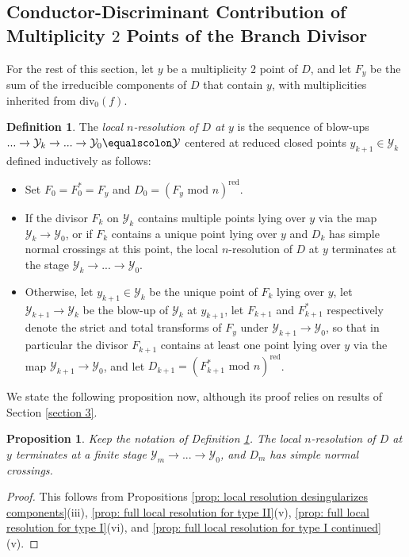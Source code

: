 \documentclass[12pt]{amsart}
\numberwithin{equation}{section}
\newtheorem{prop}[equation]{Proposition}
\theoremstyle{definition}
\newtheorem{defn}[equation]{Definition}
\newcommand{\Y}{\mathcal{Y}}
\newcommand{\tx}[1]{\text{#1}}
\begin{document}
\subsection{Conductor-Discriminant Contribution of Multiplicity $2$ Points of the Branch Divisor}\label{subsection 2.3}\hfill

For the rest of this section, let $y$ be a multiplicity $2$ point of $D$, and let $F_y$ be the sum of the irreducible components of $D$ that contain $y$, with multiplicities inherited from $\tx{div}_0(f)$.
\begin{defn}\label{dfn: resolution of local branch divisor}
    The \textit{local $n$-resolution of $D$ at $y$} is the sequence of blow-ups $...\to\Y_k\to...\to\Y_0\equalscolon \Y$ centered at reduced closed points $y_{k+1}\in\Y_k$ defined inductively as follows:
    \begin{itemize}
        \item Set $F_0=F_0^*=F_y$ and $D_0=(F_y\tx{ mod }n)^\tx{red}$.
        \item If the divisor $F_k$ on $\Y_k$ contains multiple points lying over $y$ via the map $\Y_k\to\Y_0$, or if $F_k$ contains a unique point lying over $y$ and $D_k$ has simple normal crossings at this point, the local $n$-resolution of $D$ at $y$ terminates at the stage $\Y_k\to...\to\Y_0$.
        \item Otherwise, let $y_{k+1}\in\Y_k$ be the unique point of $F_k$ lying over $y$, let $\Y_{k+1}\to\Y_k$ be the blow-up of $\Y_k$ at $y_{k+1}$, let $F_{k+1}$ and $F_{k+1}^*$ respectively denote the strict and total transforms of $F_y$ under $\Y_{k+1}\to\Y_0$, so that in particular the divisor $F_{k+1}$ contains at least one point lying over $y$ via the map $\Y_{k+1}\to\Y_0$, and let $D_{k+1}=(F_{k+1}^*\tx{ mod }n)^\tx{red}$.
\end{itemize}
\end{defn}

We state the following proposition now, although its proof relies on results of Section \ref{section 3}.

\begin{prop}\label{prop: local resolution is finite}
Keep the notation of Definition \ref{dfn: resolution of local branch divisor}. The local $n$-resolution of $D$ at $y$ terminates at a finite stage $\Y_m\to...\to\Y_0$, and $D_m$ has simple normal crossings.
\end{prop}
\begin{proof}
    This follows from Propositions \ref{prop: local resolution desingularizes components}(iii), \ref{prop: full local resolution for type II}(v), \ref{prop: full local resolution for type I}(vi), and \ref{prop: full local resolution for type I continued}(v).
 \end{proof}
\end{document}
